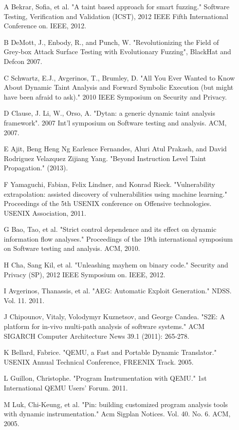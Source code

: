 \documentclass[11pt,expanded,copyright]{fsuthesis}
\begin{document}
\begin{itemize}
	\item [A] Bekrar, Sofia, et al. "A taint based approach for smart fuzzing." Software Testing, Verification and Validation (ICST), 2012 IEEE Fifth International Conference on. IEEE, 2012.
	\item [B] DeMott, J., Enbody, R., and Punch, W. "Revolutionizing the Field of Grey-box Attack Surface Testing with Evolutionary Fuzzing", BlackHat and Defcon 2007.
	\item [C] Schwartz, E.J., Avgerinos, T., Brumley, D. "All You Ever Wanted to Know About Dynamic Taint Analysis and Forward Symbolic Execution (but might have been afraid to ask)." 2010 IEEE Symposium on Security and Privacy.
	\item [D] Clause, J. Li, W., Orso, A. "Dytan: a generic dynamic taint analysis framework". 2007 Int'l symposium on Software testing and analysis. ACM, 2007.
	\item [E] Ajit, Beng Heng Ng Earlence Fernandes, Aluri Atul Prakash, and David Rodriguez Velazquez Zijiang Yang. "Beyond Instruction Level Taint Propagation." (2013).
	\item [F] Yamaguchi, Fabian, Felix Lindner, and Konrad Rieck. "Vulnerability extrapolation: assisted discovery of vulnerabilities using machine learning." Proceedings of the 5th USENIX conference on Offensive technologies. USENIX Association, 2011.
	\item [G] Bao, Tao, et al. "Strict control dependence and its effect on dynamic information flow analyses." Proceedings of the 19th international symposium on Software testing and analysis. ACM, 2010.
	\item [H] Cha, Sang Kil, et al. "Unleashing mayhem on binary code." Security and Privacy (SP), 2012 IEEE Symposium on. IEEE, 2012.
	\item [I] Avgerinos, Thanassis, et al. "AEG: Automatic Exploit Generation." NDSS. Vol. 11. 2011.
	\item [J] Chipounov, Vitaly, Volodymyr Kuznetsov, and George Candea. "S2E: A platform for in-vivo multi-path analysis of software systems." ACM SIGARCH Computer Architecture News 39.1 (2011): 265-278.
	\item [K] Bellard, Fabrice. "QEMU, a Fast and Portable Dynamic Translator." USENIX Annual Technical Conference, FREENIX Track. 2005.
	\item [L] Guillon, Christophe. "Program Instrumentation with QEMU." 1st International QEMU Users’ Forum. 2011.
	\item [M] Luk, Chi-Keung, et al. "Pin: building customized program analysis tools with dynamic instrumentation." Acm Sigplan Notices. Vol. 40. No. 6. ACM, 2005.

\end{itemize}
\end{document}
